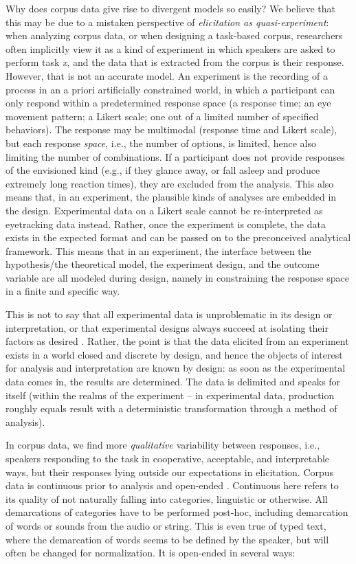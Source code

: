\documentclass[output=paper,colorlinks,citecolor=brown]{langscibook}
\begin{document}
Why does corpus data give rise to divergent models so easily? We believe that this may be due to a mistaken perspective of \textit{elicitation as quasi-experiment}: when analyzing corpus data, or when designing a task-based corpus, researchers often implicitly view it as a kind of experiment in which speakers are asked to perform task \textit{x}, and the data that is extracted from the corpus is their response. However, that is not an accurate model. An experiment is the recording of a process in an a priori artificially constrained world, in which a participant can only respond within a predetermined response space (a response time; an eye movement pattern; a Likert scale; one out of a limited number of specified behaviors). The response may be multimodal (response time and Likert scale), but each response \textit{space}, i.e., the number of options, is limited, hence also limiting the number of combinations. If a participant does not provide responses of the envisioned kind (e.g., if they glance away, or fall asleep and produce extremely long reaction times), they are excluded from the analysis. This also means that, in an experiment, the plausible kinds of analyses are embedded in the design. Experimental data on a Likert scale cannot be re-interpreted as eyetracking data instead. Rather, once the experiment is complete, the data exists in the expected format and can be passed on to the preconceived analytical framework. This means that in an experiment, the interface between the hypothesis/the theoretical model, the experiment design, and the outcome variable are all modeled during design, namely in constraining the response space in a finite and specific way.

This is not to say that all experimental data is unproblematic in its design or interpretation, or that experimental designs always succeed at isolating their factors as desired \parencite{dewaele2019vital,gozli2019shifting}. Rather, the point is that the data elicited from an experiment exists in a world closed and discrete by design, and hence the objects of interest for analysis and interpretation are known by design: as soon as the experimental data comes in, the results are determined. The data is delimited and speaks for itself (within the realms of the experiment -- in experimental data, production roughly equals result with a deterministic transformation through a method of analysis).

In corpus data, we find more \textit{qualitative} variability between responses, i.e., speakers responding to the task in cooperative, acceptable, and interpretable ways, but their responses lying outside our expectations in elicitation. Corpus data is continuous prior to analysis and open-ended \parencite{Moisl2009}. Continuous here refers to its quality of not naturally falling into categories, linguistic or otherwise. All demarcations of categories have to be performed post-hoc, including demarcation of words or sounds from the audio or string. This is even true of typed text, where the demarcation of words seems to be defined by the speaker, but will often be changed for normalization. It is open-ended in several ways:
\largerpage
\end{document}
